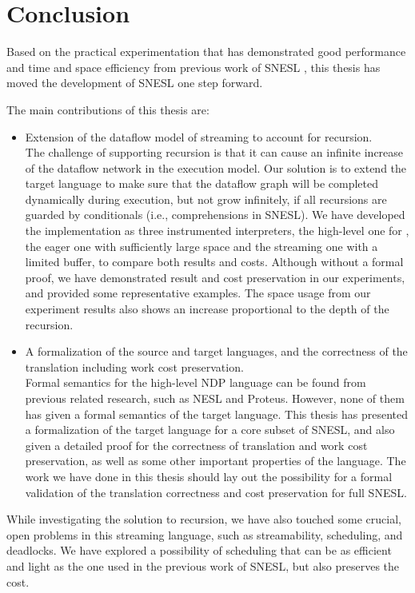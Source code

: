 \chapter{Conclusion}
Based on the practical experimentation that has demonstrated good performance and time and space efficiency from previous work of SNESL \cite{Fphd}, this thesis has moved  the development of SNESL one step forward. 

The main contributions of this thesis are:
\begin{itemize}
	\item Extension of the dataflow model of streaming to account for recursion. \\
	The challenge of supporting recursion is that it can cause an infinite increase of the dataflow network in the execution model.
	Our solution is to extend the target language to make sure that the dataflow graph will be completed dynamically during execution, but not grow infinitely, if all recursions are guarded by conditionals (i.e., comprehensions in SNESL). 
	We have developed the implementation as three instrumented interpreters, the high-level one for \mysnesl, the eager one with sufficiently large space  and the streaming one with a limited buffer,  to compare both results and costs. 
	Although without a formal proof, we have demonstrated result and cost preservation in our experiments, and provided some representative examples.
	The space usage from our experiment results also shows an increase proportional to the depth of the recursion. 
	
\item A formalization of the source and target languages, and the correctness of the translation including work cost preservation.  \\
Formal semantics for the high-level NDP language can be found from previous related research, such as NESL and Proteus. However, none of them has given a formal semantics of the target language. 
This thesis has presented a formalization of the target language for a core subset of SNESL, and also given a detailed proof for the correctness of translation and work cost preservation, as well as some other important properties of the language.
The work we have done in this thesis should lay out the possibility for a formal validation of the translation correctness and cost preservation for full SNESL.
\end{itemize}

While investigating the solution to recursion, we have also touched some crucial, open problems in this streaming language,  such as streamability, scheduling, and deadlocks. 
We have explored a possibility of scheduling that can be as efficient and light as the one used in the previous work of SNESL, but also preserves the cost.

